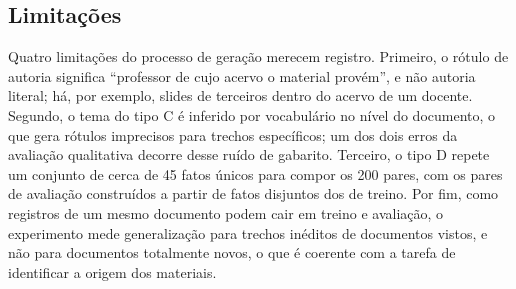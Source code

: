 \subsection{Limitações}

Quatro limitações do processo de geração merecem registro. Primeiro, o rótulo de
autoria significa ``professor de cujo acervo o material provém'', e não autoria
literal; há, por exemplo, slides de terceiros dentro do acervo de um docente.
Segundo, o tema do tipo C é inferido por vocabulário no nível do documento, o que
gera rótulos imprecisos para trechos específicos; um dos dois erros da avaliação
qualitativa decorre desse ruído de gabarito. Terceiro, o tipo D repete um conjunto
de cerca de 45 fatos únicos para compor os 200 pares, com os pares de avaliação
construídos a partir de fatos disjuntos dos de treino. Por fim, como registros de um
mesmo documento podem cair em treino e avaliação, o experimento mede generalização
para trechos inéditos de documentos vistos, e não para documentos totalmente novos,
o que é coerente com a tarefa de identificar a origem dos materiais.
